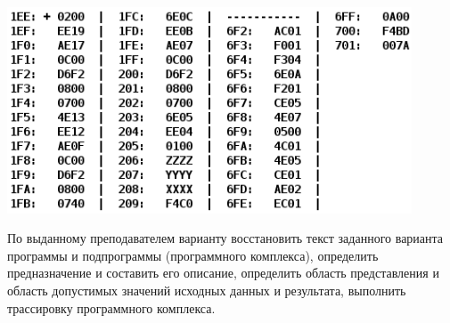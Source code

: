 \begin{minipage}{0.3\textwidth}
  \includegraphics[width=0.9\textwidth]{img/task.png}
\end{minipage}

\begin{minipage}{0.5\textwidth}
  По выданному преподавателем варианту восстановить текст заданного варианта программы и подпрограммы (программного комплекса), определить предназначение и составить его описание, определить область представления и область допустимых значений исходных данных и результата, выполнить трассировку программного комплекса.
\end{minipage}
